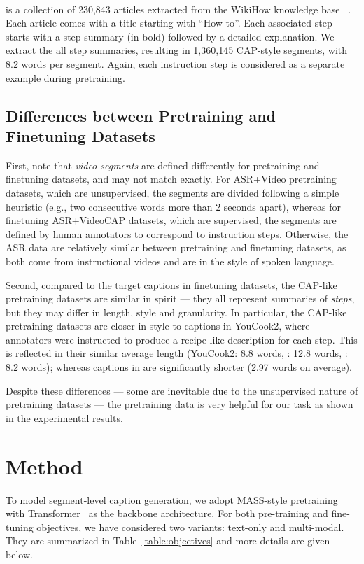 \documentclass[11pt,a4paper]{article}
\begin{document}
\paragraph{\wikihow} is a collection of 230,843 articles extracted from the WikiHow knowledge base ~\citep{koupaee2018wikihow}. Each article comes with a title starting with ``How to''.  Each associated step starts with a step summary (in bold) followed by a detailed explanation. 
We extract the all step summaries, resulting in 1,360,145 CAP-style segments, with 8.2 words per segment.
Again, each instruction step is considered as a separate example during pretraining.


\subsection{Differences between Pretraining and Finetuning Datasets}

First, note that \textit{video segments} are defined differently for pretraining and finetuning datasets, and may not match exactly. For ASR+Video pretraining datasets, which are unsupervised, the segments are divided following a simple heuristic (e.g., two consecutive words more than 2 seconds apart), whereas for finetuning ASR+VideoCAP datasets, which are supervised, the segments are defined by human annotators to correspond to instruction steps. 
Otherwise, the ASR data are relatively similar between pretraining and finetuning datasets, as both come from instructional videos and are in the style of spoken language.

Second, compared to the target captions in finetuning datasets, the CAP-like pretraining datasets are similar in spirit --- they all represent summaries of \textit{steps}, but they may differ in length, style and granularity.
In particular, the CAP-like pretraining datasets are closer in style to captions in YouCook2, where annotators were instructed to produce a recipe-like description for each step.  This is reflected in their similar average length (YouCook2: 8.8 words, \recipes: 12.8 words, \wikihow: 8.2 words); whereas captions in \ldvm are significantly shorter (2.97 words on average).


Despite these differences --- some are inevitable due to the unsupervised nature of pretraining datasets --- the pretraining data is very helpful for our task as shown in the experimental results.




 
\section{Method}
\label{sec:model}
To model segment-level caption generation, we adopt MASS-style pretraining~\cite{song2019mass} with Transformer~\cite{vaswani2017attention} as the backbone architecture. For both pre-training and fine-tuning objectives, we have considered two variants: text-only 
and multi-modal.
They are summarized in Table~\ref{table:objectives} and more details are given below.
\end{document}
